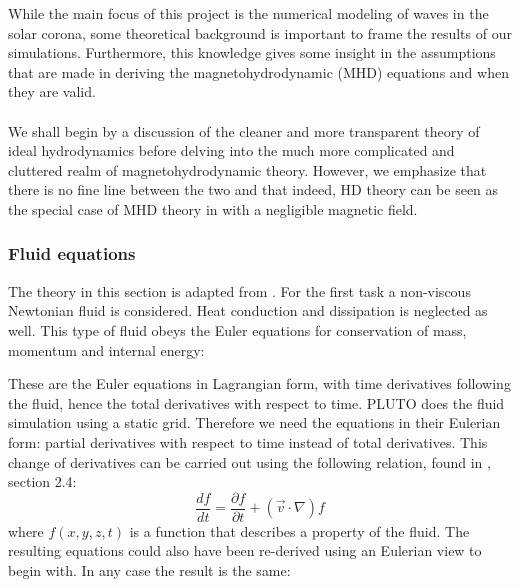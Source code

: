 While the main focus of this project is the numerical modeling of waves in the solar corona, some theoretical background is important to frame the results of our simulations.
Furthermore, this knowledge gives some insight in the assumptions that are made in deriving the magnetohydrodynamic (MHD) equations and when they are valid. \\
\\
We shall begin by a discussion of the cleaner and more transparent theory of ideal hydrodynamics before delving into the much more complicated and cluttered realm of magnetohydrodynamic theory. However, we emphasize that there is no fine line between the two and that indeed, HD theory can be seen as the special case of MHD theory in with a negligible magnetic field. 

\subsubsection{Fluid equations}
The theory in this section is adapted from \cite{notes-fluid-dynamics}. For the first task a non-viscous Newtonian fluid is considered. Heat conduction and dissipation is neglected as well.
This type of fluid obeys the Euler equations for conservation of mass, momentum and internal energy:

{\centering
\noindent {}\par}


These are the Euler equations in Lagrangian form, with time derivatives following the fluid, hence the total derivatives with respect to time.
PLUTO does the fluid simulation using a static grid. Therefore we need the equations in their Eulerian form: partial derivatives with respect to time instead of total derivatives.
This change of derivatives can be carried out using the following relation, found in \cite{notes-fluid-dynamics}, section 2.4:
\begin{equation}
	\frac{df}{dt} = \frac{\partial f}{\partial t} + (\vec{v} \cdot \nabla) f
	\label{eq:relation-total-partial}
\end{equation}
where $f(x,y,z,t)$ is a function that describes a property of the fluid. The resulting equations could also have been re-derived using an Eulerian view to begin with. In any case the result is the same:

